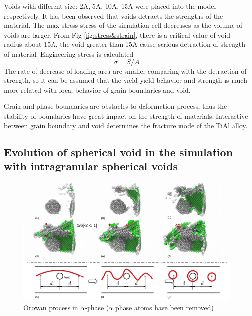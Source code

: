 \documentclass[metals,article,submit,moreauthors,pdftex,10pt,a4paper]{Definitions/mdpi}
\begin{document}
Voids with different size: 2A, 5A, 10A, 15A were placed into the model respectively. It has been observed that voids detracts the strengths of the material. The max stress stress of the simulation cell decreases as the volume of voids are larger. From Fig \ref{fig:stress&strain}, there is a critical value of void radius about 15A, the void greater than 15A cause serious detraction of strength of material. 
Engineering stress is calculated
	$$ \sigma = S/A$$
The rate of decrease of loading area are smaller comparing with the detraction of strength, so it can be assumed that the yield yield behavior and strength is much more related with local behavior of grain boundaries and void.
	
Grain and phase boundaries are obstacles to deformation process, thus the stability of boundaries have great impact on the strength of materials. Interactive between grain boundary and void determines the fracture mode of the TiAl alloy.

\subsection{Evolution of spherical void in the simulation with intragranular spherical voids}

\begin{figure}[ht]
	\centering
	\includegraphics[width=1\linewidth]{"img/dis-void2"}
	\caption{Orowan process in $\alpha$-phase ($\alpha$ phase atoms have been removed)}
	\label{fig:orowan}
\end{figure}
\end{document}
